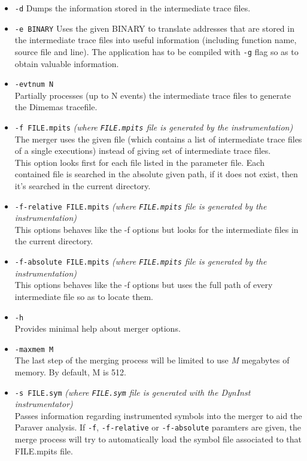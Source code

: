 \begin{itemize}
 \item {\tt -d}
 Dumps the information stored in the intermediate trace files.
 \item {\tt -e BINARY}
 Uses the given BINARY to translate addresses that are stored in the intermediate trace files into useful information (including function name, source file and line). The application has to be compiled with {\tt -g} flag so as to obtain valuable information.
 \item {\tt -evtnum N}\\
 Partially processes (up to N events) the intermediate trace files to generate the Dimemas tracefile.
 \item {\tt -f FILE.mpits} {\em (where {\tt FILE.mpits} file is generated by the instrumentation)}\\
 The merger uses the given file (which contains a list of intermediate trace files of a single executions) instead of giving set of intermediate trace files.\\
 This option looks first for each file listed in the parameter file. Each contained file is searched in the absolute given path, if it does not exist, then it's searched in the current directory.
 \item {\tt -f-relative FILE.mpits} {\em (where {\tt FILE.mpits} file is generated by the instrumentation)}\\
 This options behaves like the -f options but looks for the intermediate files in the current directory.
 \item {\tt -f-absolute FILE.mpits} {\em (where {\tt FILE.mpits} file is generated by the instrumentation)}\\
 This options behaves like the -f options but uses the full path of every intermediate file so as to locate them.
 \item {\tt -h}\\
 Provides minimal help about merger options.
 \item {\tt -maxmem M}\\
 The last step of the merging process will be limited to use {\em M} megabytes of memory. By default, M is 512.
 \item {\tt -s FILE.sym} {\em (where {\tt FILE.sym} file is generated with the DynInst instrumentator)}\\
 Passes information regarding instrumented symbols into the merger to aid the Paraver analysis. If {\tt -f}, {\tt -f-relative} or {\tt -f-absolute} paramters are given, the merge process will try to automatically load the symbol file associated to that FILE.mpits file.

\end{itemize}
